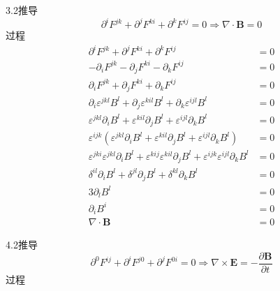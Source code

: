 3.2推导
\begin{equation}
    \partial ^iF^{jk}+\partial ^jF^{ki}+\partial ^kF^{ij}=0\Rightarrow \nabla \cdot \mathbf{B}=0
\end{equation}
过程
\begin{equation}
    \begin{aligned}
        \partial ^iF^{jk}+\partial ^jF^{ki}+\partial ^kF^{ij}&=0
\\
-\partial _iF^{jk}-\partial _jF^{ki}-\partial _kF^{ij}&=0
\\
\partial _iF^{jk}+\partial _jF^{ki}+\partial _kF^{ij}&=0
\\
\partial _i\varepsilon ^{jkl}B^l+\partial _j\varepsilon ^{kil}B^l+\partial _k\varepsilon ^{ijl}B^l&=0
\\
\varepsilon ^{jkl}\partial _iB^l+\varepsilon ^{kil}\partial _jB^l+\varepsilon ^{ijl}\partial _kB^l&=0
\\
\varepsilon ^{ijk}\left( \varepsilon ^{jkl}\partial _iB^l+\varepsilon ^{kil}\partial _jB^l+\varepsilon ^{ijl}\partial _kB^l \right) &=0
\\
\varepsilon ^{jki}\varepsilon ^{jkl}\partial _iB^l+\varepsilon ^{kij}\varepsilon ^{kil}\partial _jB^l+\varepsilon ^{ijk}\varepsilon ^{ijl}\partial _kB^l&=0
\\
\delta ^{il}\partial _iB^l+\delta ^{jl}\partial _jB^l+\delta ^{kl}\partial _kB^l&=0
\\
3\partial _lB^l&=0
\\
\partial _iB^i&=0
\\
\nabla \cdot \mathbf{B}&=0
    \end{aligned}
\end{equation}




4.2推导
\begin{equation}
    \partial ^0F^{ij}+\partial ^iF^{j0}+\partial ^jF^{0i}=0\Rightarrow \nabla \times \mathbf{E}=-\frac{\partial \mathbf{B}}{\partial t}
\end{equation}
过程
\begin{equation}
    \begin{aligned}
        
    \end{aligned}
\end{equation}


